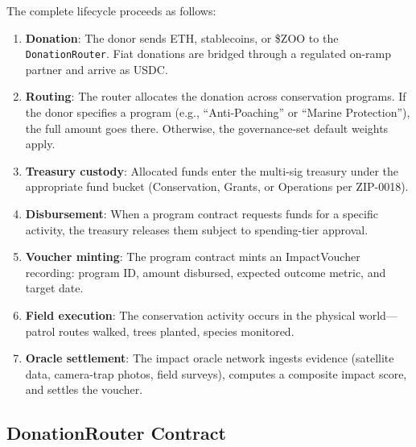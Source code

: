 \documentclass[11pt,letterpaper]{article}
\begin{document}
The complete lifecycle proceeds as follows:

\begin{enumerate}
    \item \textbf{Donation}: The donor sends ETH, stablecoins, or \$ZOO to the \texttt{DonationRouter}. Fiat donations are bridged through a regulated on-ramp partner and arrive as USDC.
    \item \textbf{Routing}: The router allocates the donation across conservation programs. If the donor specifies a program (e.g., ``Anti-Poaching'' or ``Marine Protection''), the full amount goes there. Otherwise, the governance-set default weights apply.
    \item \textbf{Treasury custody}: Allocated funds enter the multi-sig treasury under the appropriate fund bucket (Conservation, Grants, or Operations per ZIP-0018).
    \item \textbf{Disbursement}: When a program contract requests funds for a specific activity, the treasury releases them subject to spending-tier approval.
    \item \textbf{Voucher minting}: The program contract mints an ImpactVoucher recording: program ID, amount disbursed, expected outcome metric, and target date.
    \item \textbf{Field execution}: The conservation activity occurs in the physical world---patrol routes walked, trees planted, species monitored.
    \item \textbf{Oracle settlement}: The impact oracle network ingests evidence (satellite data, camera-trap photos, field surveys), computes a composite impact score, and settles the voucher.
\end{enumerate}

\subsection{DonationRouter Contract}
\label{sec:router}
\end{document}
